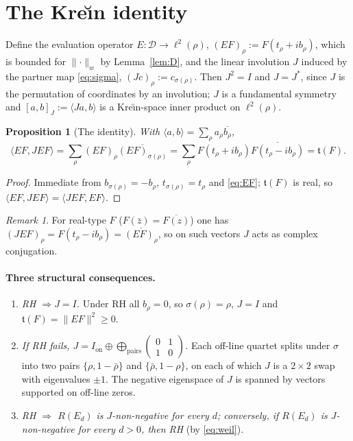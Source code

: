 \documentclass[11pt]{amsart}
\newtheorem{proposition}[theorem]{Proposition}
\theoremstyle{definition}
\theoremstyle{remark}
\newtheorem{remark}[theorem]{Remark}
\newcommand{\tform}{\mathfrak t}
\newcommand{\Norm}[1]{\lVert #1 \rVert}
\begin{document}
\section{The Kre\u{\i}n identity}\label{sec:krein}

Define the evaluation operator $E:\mathcal D\to\ell^{2}(\rho)$,
$(EF)_\rho:=F(t_\rho+ib_\rho)$, which is bounded for $\Norm{\cdot}_w$ by
Lemma~\ref{lem:D}, and the linear involution $J$ induced by the partner map
\eqref{eq:sigma}, $(Jc)_\rho:=c_{\sigma(\rho)}$. Then $J^{2}=I$ and $J=J^{*}$, since $J$ is
the permutation of coordinates by an involution; $J$ is a fundamental symmetry and
$[a,b]_J:=\langle Ja,b\rangle$ is a Kre\u{\i}n-space inner product on $\ell^{2}(\rho)$.

\begin{proposition}[The identity]\label{prop:identity}
With $\langle a,b\rangle=\sum_\rho a_\rho\overline{b_\rho}$,
\[
\langle EF,JEF\rangle=\sum_\rho (EF)_\rho\overline{(EF)_{\sigma(\rho)}}
=\sum_\rho F(t_\rho+ib_\rho)\overline{F(t_\rho-ib_\rho)}=\tform(F).
\]
\end{proposition}
\begin{proof}
Immediate from $b_{\sigma(\rho)}=-b_\rho$, $t_{\sigma(\rho)}=t_\rho$ and \eqref{eq:EF};
$\tform(F)$ is real, so $\langle EF,JEF\rangle=\langle JEF,EF\rangle$.
\end{proof}

\begin{remark}
For real-type $F$ ($F(\bar z)=\overline{F(z)}$) one has
$(JEF)_\rho=F(t_\rho-ib_\rho)=\overline{(EF)_\rho}$, so on such vectors $J$ acts as
complex conjugation.
\end{remark}

\paragraph{Three structural consequences.}
\begin{enumerate}[label=\textbf{(C\arabic*)}]
\item \emph{RH $\Rightarrow J=I$.} Under RH all $b_\rho=0$, so $\sigma(\rho)=\rho$,
$J=I$ and $\tform(F)=\Norm{EF}^{2}\ge0$.
\item \emph{If RH fails,
$J=I_{\mathrm{on}}\oplus\bigoplus_{\text{pairs}}\left(\begin{smallmatrix}0&1\\1&0\end{smallmatrix}\right)$.}
Each off-line quartet splits under $\sigma$ into two pairs $\{\rho,1-\bar\rho\}$ and
$\{\bar\rho,1-\rho\}$, on each of which $J$ is a $2\times2$ swap with eigenvalues $\pm1$. The
negative eigenspace of $J$ is spanned by vectors supported on off-line zeros.
\item \emph{RH $\Rightarrow$ $R(E_d)$ is $J$-non-negative for every $d$; conversely, if
$R(E_d)$ is $J$-non-negative for every $d>0$, then RH} (by \eqref{eq:weil}).
\end{enumerate}
\end{document}
